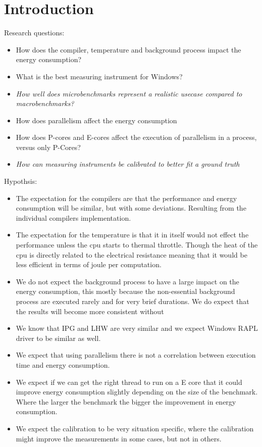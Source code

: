 \section{Introduction}

Research questions:

\begin{itemize}
    \item How does the compiler, temperature and background process impact the energy consumption?
    \item What is the best measuring instrument for Windows? %
    \item \textit{How well does microbenchmarks represent a realistic usecase compared to macrobenchmarks?}
    \item How does parallelism affect the energy consumption
    \item How does P-cores and E-cores affect the execution of parallelism in a process, versus only P-Cores?
    \item \textit{How can measuring instruments be calibrated to better fit a ground truth}
\end{itemize}


Hypothsis:

\begin{itemize}
    \item The expectation for the compilers are that the performance and energy consumption will be similar, but with some deviations. Resulting from the individual compilers implementation.
    \item The expectation for the temperature is that it in itself would not effect the performance unless the cpu starts to thermal throttle. Though the heat of the cpu is directly related to the electrical resistance meaning that it would be less efficient in terms of joule per computation.
    \item We do not expect the background process to have a large impact on the energy consumption, this mostly because the non-essential background process are executed rarely and for very brief durations. We do expect that the results will become more consistent without 
    \item We know that IPG and LHW are very similar and we expect Windows RAPL driver to be similar as well.
    \item We expect that using parallelism there is not a correlation between execution time and energy consumption.
    \item We expect if we can get the right thread to run on a E core that it could improve energy consumption slightly depending on the size of the benchmark. Where the larger the benchmark the bigger the improvement in energy consumption. %
    \item We expect the calibration to be very situation specific, where the calibration might improve the measurements in some cases, but not in others.
\end{itemize}